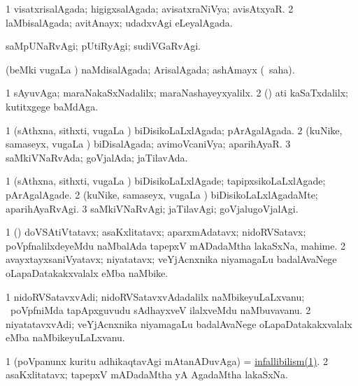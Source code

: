 \bentry
{}
\gl{\gu}
\bmng
\bnum
\num{1} visatxrisalAgada; higigxsalAgada; avisatxraNiVya; avisAtxyaR. 
\num{2} laMbisalAgada; avitAnayx; udadxvAgi eLeyalAgada. 
\enum
\emng
\eentry

\bentry
{}
\gl{\kirxvi}
\expl{\Latin }
\bmng
saMpUNaRvAgi; pUtiRyAgi; sudiVGaRvAgi. 
\emng
\eentry

\bentry
{}
\gl{\gu}
\bmng
(beMki \mo vugaLa \vi) naMdisalAgada; ArisalAgada; ashAmayx (\rUpa\ saha). 
\emng
\eentry

\bentry
{}
\gl{\kirxvi}
\expl{\Latin }
\bmng
\bnum
\num{1} sAyuvAga; maraNakaSxNadalilx; maraNashayeyxyalilx. 
\num{2} (\rUpa) ati kaSaTxdalilx; kutitxgege baMdAga. 
\enum
\emng
\eentry

\bentry
{}
\gl{\gu}
\bmng
\bnum
\num{1} (sAthxna, sithxti, \mo vugaLa \vi) biDisikoLaLxlAgada; pArAgalAgada. 
\num{2} (kuNike, samaseyx, \mo vugaLa \vi) biDisalAgada; avimoVcaniVya; aparihAyaR. 
\num{3} saMkiVNaRvAda; goVjalAda; jaTilavAda. 
\enum
\emng
\eentry

\bentry
{}
\gl{\kirxvi}
\bmng
\bnum
\num{1} (sAthxna, sithxti, \mo vugaLa \vi) biDisikoLaLxlAgade; tapipxsikoLaLxlAgade; pArAgalAgade. 
\num{2} (kuNike, samaseyx, \mo vugaLa \vi) biDisikoLaLxlAgadaMte; aparihAyaRvAgi. 
\num{3} saMkiVNaRvAgi; jaTilavAgi; goVjalugoVjalAgi. 
\enum
\emng
\eentry

\bentry
{}
\gl{\nA}
\bmng
\bnum
\num{1} (\roVkAyx) doVSAtiVtatavx; asaKxlitatavx; aparxmAdatavx; nidoRVSatavx; poVpfnalilxdeyeMdu naMbalAda tapepxV mADadaMtha lakaSxNa, mahime. 
\num{2} avayxtayxsaniVyatavx; niyatatavx; veYjAcnxnika niyamagaLu badalAvaNege oLapaDatakakxvalalx eMba naMbike. 
\enum
\emng
\eentry

\bentry
{}
\gl{\nA}
\bmng
\bnum
\num{1} nidoRVSatavxvAdi; nidoRVSatavxvAdadalilx naMbikeyuLaLxvanu; \kanmu\ poVpfniMda tapApxguvudu sAdhayxveV ilalxveMdu naMbuvavanu. 
\num{2} niyatatavxvAdi; veYjAcnxnika niyamagaLu badalAvaNege oLapaDatakakxvalalx eMba naMbikeyuLaLxvanu. 
\enum
\emng
\eentry

\bentry
{}
\gl{\nA}
\bmng
\bnum
\num{1} (poVpanunx kuritu adhikaqtavAgi mAtanADuvAga)  = \hyperlink{infallibilism}{infallibilism(1)}. 
\num{2} asaKxlitatavx; tapepxV mADadaMtha yA AgadaMtha lakaSxNa. 
\enum
\emng
\eentry

